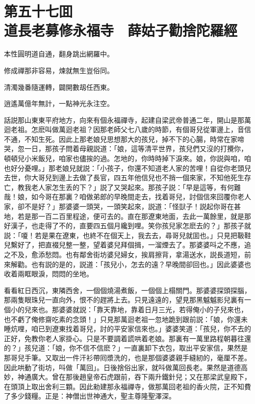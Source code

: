 
\chapter*{第五十七囬　\\道長老募修永福寺　薛姑子勸捨陀羅經}


\begin{myquote}
本性圓明道自通，翻身跳出網羅中。

修成禪那非容易，煉就無生豈俗同。

清濁幾番隨運轉，闢開數刼任西東。

逍遙萬億年無計，一點神光永注空。
\end{myquote}

話説那山東東平府地方，向來有個永福禪寺，起建自梁武帝普通二年，開山是那萬迴老祖。怎麽叫做萬迴老祖？因那老師父七八歲的時節，有個哥兒從軍邊上，音信不通，不知生死。因此上那老娘兒思想那大的孩兒，掉不下的心腸，時常在家啼哭，忽一日，那孩子問着母親説道：「娘，這等清平世界，孩兒們又沒的打攪你，頓頓兒小米飯兒，咱家也儘挨的過。怎地的，你時時掉下淚來。娘，你説與咱，咱也好分憂哩。」那老娘兒就説：「小孩子，你還不知道老人家的苦哩！自從你老頭兒去世，你大哥兒到邊上去做了長官，四五年他信兒也不捎一個來家，不知他死生存亡，教我老人家怎生丢的下？」説了又哭起來。那孩子説：「早是這等，有何難哉！娘，如今哥在那裏？咱做弟郎的早晚間走去，找着哥兒，討個信來回覆你老人家，卻不是好？」那婆婆一頭哭，一頭笑起來，説道：「怪獃子！説起你哥在甚地，若是那一百二百里程途，便可去的。直在那遼東地面，去此一萬餘里，就是那好漢子，也走得了不的，直要四五個月纔到哩。笑你孩兒家怎麽去的？」那孩子就説：「嗄！若是果在遼東，也終不在個天上，我去去，尋哥兒就囬也。」只見把靸鞋兒繫好了，把直裰兒整一整，望着婆兒拜個揖，一溜煙去了。那婆婆呌之不應，追之不及，愈添愁悶。也有鄰舍街坊婆兒婦女，挨肩擦背，拿湯送水，説長道短，前來解勸。也有説的是的，説道：「孩兒小，怎去的遠？早晚間卻回也。」因此婆婆也收着兩眶眼淚，悶悶的坐地。

看看紅日西沉，東隣西舍，一個個燒湯煮飯，一個個上榻關門。那婆婆探頭探腦，那兩隻眼珠兒一直向外，恨不的趕將上去。只見遠遠的，望見那黑魆魆影兒裏有一個小的兒來也。那婆婆就説：「靠天靠地，靠着日月三光，若得俺小的子兒來也，也不虧了俺修齋吃素的念頭！」只見那萬迴老祖一忽地跪到跟前説：「娘，你還未睡炕哩，咱已到遼東找着哥兒，討的平安家信來也。」婆婆笑道：「孩兒，你不去的正好，免教你老人家掛心。只是不要調着謊哄着老娘。那裏有一萬里路程朝暮往還的？」孩兒道：「娘，你不信不信麽？」一直裏卸下衣包，取出平安家信，果然是那哥兒手筆。又取出一件汗衫帶囘漿洗的，也是那個婆婆親手縫紉的，毫厘不差。因此哄動了街坊，呌做「萬回」。日後捨俗出家，就呌做萬回長老。果然是道德高妙，神通廣大。曾在那後趙皇帝石虎跟前，吞下兩升鐵針兒；又在那梁武皇殿下，在頭頂上取出舍利三顆。因此勑建那永福禪寺，做那萬回老祖的香火院，正不知費了多少錢糧。正是：神僧出世神通大，聖主尊隆聖澤深。

